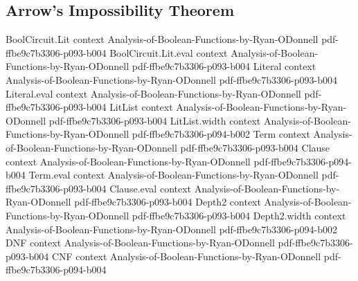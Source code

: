 \subsection{Arrow's Impossibility Theorem}

\begin{theorem}
\label{ArrowTheorem.arrow_theorem}
\leanok
{}
\proofstep
  {BoolCircuit.Lit}
  {context}
  {Analysis-of-Boolean-Functions-by-Ryan-ODonnell}
  {pdf-ffbe9c7b3306-p093-b004}
\proofstep
  {BoolCircuit.Lit.eval}
  {context}
  {Analysis-of-Boolean-Functions-by-Ryan-ODonnell}
  {pdf-ffbe9c7b3306-p093-b004}
\proofstep
  {Literal}
  {context}
  {Analysis-of-Boolean-Functions-by-Ryan-ODonnell}
  {pdf-ffbe9c7b3306-p093-b004}
\proofstep
  {Literal.eval}
  {context}
  {Analysis-of-Boolean-Functions-by-Ryan-ODonnell}
  {pdf-ffbe9c7b3306-p093-b004}
\proofstep
  {LitList}
  {context}
  {Analysis-of-Boolean-Functions-by-Ryan-ODonnell}
  {pdf-ffbe9c7b3306-p093-b004}
\proofstep
  {LitList.width}
  {context}
  {Analysis-of-Boolean-Functions-by-Ryan-ODonnell}
  {pdf-ffbe9c7b3306-p094-b002}
\proofstep
  {Term}
  {context}
  {Analysis-of-Boolean-Functions-by-Ryan-ODonnell}
  {pdf-ffbe9c7b3306-p093-b004}
\proofstep
  {Clause}
  {context}
  {Analysis-of-Boolean-Functions-by-Ryan-ODonnell}
  {pdf-ffbe9c7b3306-p094-b004}
\proofstep
  {Term.eval}
  {context}
  {Analysis-of-Boolean-Functions-by-Ryan-ODonnell}
  {pdf-ffbe9c7b3306-p093-b004}
\proofstep
  {Clause.eval}
  {context}
  {Analysis-of-Boolean-Functions-by-Ryan-ODonnell}
  {pdf-ffbe9c7b3306-p093-b004}
\proofstep
  {Depth2}
  {context}
  {Analysis-of-Boolean-Functions-by-Ryan-ODonnell}
  {pdf-ffbe9c7b3306-p093-b004}
\proofstep
  {Depth2.width}
  {context}
  {Analysis-of-Boolean-Functions-by-Ryan-ODonnell}
  {pdf-ffbe9c7b3306-p094-b002}
\proofstep
  {DNF}
  {context}
  {Analysis-of-Boolean-Functions-by-Ryan-ODonnell}
  {pdf-ffbe9c7b3306-p093-b004}
\proofstep
  {CNF}
  {context}
  {Analysis-of-Boolean-Functions-by-Ryan-ODonnell}
  {pdf-ffbe9c7b3306-p094-b004}

\end{theorem}
